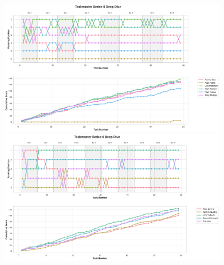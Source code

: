 \documentclass[10pt,letterpaper]{article}
\begin{document}
\begin{figure}[!h]
\centering
\includegraphics[width=\linewidth]{supfigure/series_5_deep_dive.png}
\includegraphics[width=\linewidth]{supfigure/series_6_deep_dive.png}
\end{figure}
\FloatBarrier
\clearpage
\end{document}
